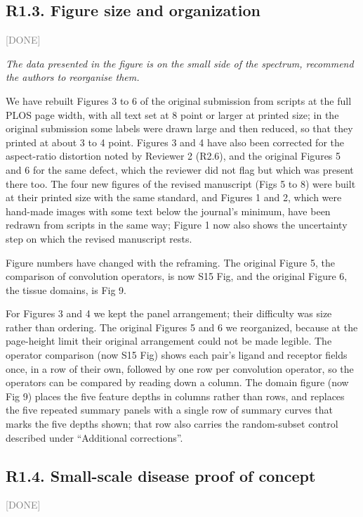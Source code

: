 \documentclass[11pt]{article}
\newcommand{\status}[1]{\textcolor{gray}{\small\textsf{[#1]}}}
\newenvironment{rev}{\begin{leftbar}\itshape\small}{\end{leftbar}}
\begin{document}
\subsection{R1.3. Figure size and organization} \status{DONE}

\begin{rev}
The data presented in the figure is on the small side of the spectrum, recommend the
authors to reorganise them.
\end{rev}

\noindent We have rebuilt Figures 3 to 6 of the original submission from scripts at the full
PLOS page width, with all text set at 8 point or larger at printed size; in the original
submission some labels were drawn large and then reduced, so that they printed at about 3 to 4
point. Figures 3 and 4 have also been corrected for the aspect-ratio distortion noted by Reviewer 2
(R2.6), and the original Figures 5 and 6 for the same defect, which the reviewer did not flag but
which was present there too. The four new figures of the revised manuscript (Figs 5 to 8) were
built at their printed size with the same standard, and Figures 1 and 2, which were hand-made
images with some text below the journal's minimum, have been redrawn from scripts in the same
way; Figure 1 now also shows the uncertainty step on which the revised manuscript rests.

Figure numbers have changed with the reframing. The original Figure 5, the comparison of
convolution operators, is now S15 Fig, and the original Figure 6, the tissue domains, is Fig 9.

For Figures 3 and 4 we kept the panel arrangement; their difficulty was size rather than
ordering. The original Figures 5 and 6 we reorganized, because at the page-height limit their
original arrangement could not be made legible. The operator comparison (now S15 Fig) shows each
pair's ligand and receptor fields once, in a row of their own, followed by one row per
convolution operator, so the operators can be compared by reading down a column. The domain
figure (now Fig 9) places the five feature depths in columns rather than rows, and replaces the
five repeated summary panels with a single row of summary curves that marks the five depths
shown; that row also carries the random-subset control described under ``Additional
corrections''.

\subsection{R1.4. Small-scale disease proof of concept} \status{DONE}
\end{document}
